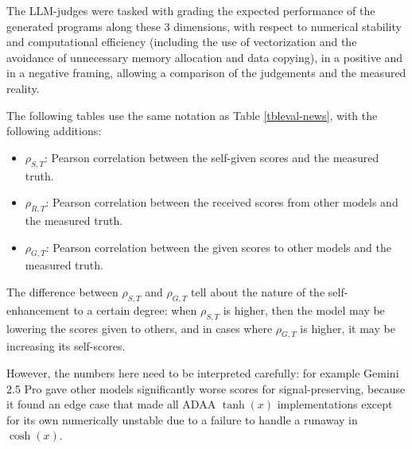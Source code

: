 \documentclass[noindent,nohyp,parspace,titlepage,twoside,12pt]{article}
\begin{document}
      The LLM-judges were tasked with grading the expected performance of the
      generated programs along these 3 dimensions, with respect to numerical
      stability and computational efficiency (including the use of vectorization
      and the avoidance of unnecessary memory allocation and data copying), in
      a positive and in a negative framing, allowing a comparison of the
      judgements and the measured reality.

      The following tables use the same notation as Table \ref{tbleval-news},
      with the following additions:

      \begin{itemize}
        \item $\rho_{S, T}$: Pearson correlation between the self-given scores
              and the measured truth.

        \item $\rho_{R, T}$: Pearson correlation between the received scores
              from other models and the measured truth.

        \item $\rho_{G, T}$: Pearson correlation between the given scores to
              other models and the measured truth.
      \end{itemize}

      The difference between $\rho_{S, T}$ and $\rho_{G, T}$ tell about the
      nature of the self-enhancement to a certain degree: when $\rho_{S, T}$ is
      higher, then the model may be lowering the scores given to others, and in
      cases where $\rho_{G, T}$ is higher, it may be increasing its self-scores.

      However, the numbers here need to be interpreted carefully: for
      example Gemini 2.5 Pro gave other models significantly worse scores for
      signal-preserving, because it found an edge case that made all ADAA
      $\tanh(x)$ implementations except for its own numerically unstable due
      to a failure to handle a runaway in $\cosh(x)$.
\end{document}
